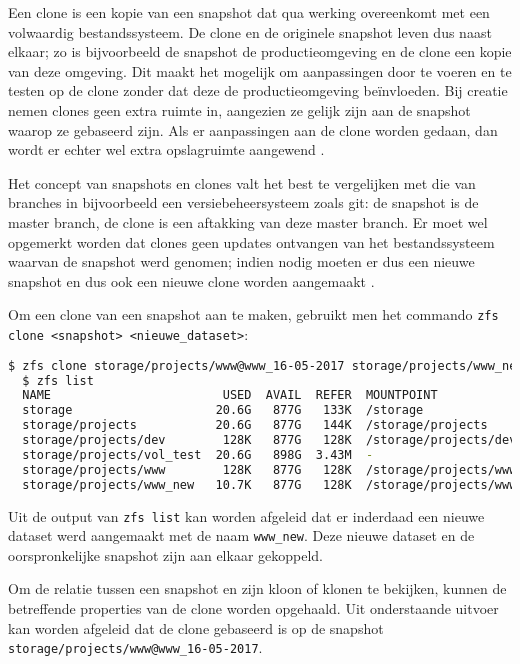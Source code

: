 Een clone is een kopie van een snapshot dat qua werking overeenkomt met een volwaardig bestandssysteem. De clone en de originele snapshot leven dus naast elkaar; zo is bijvoorbeeld de snapshot de productieomgeving en de clone een kopie van deze omgeving. Dit maakt het mogelijk om aanpassingen door te voeren en te testen op de clone zonder dat deze de productieomgeving beïnvloeden. Bij creatie nemen clones geen extra ruimte in, aangezien ze gelijk zijn aan de snapshot waarop ze gebaseerd zijn. Als er aanpassingen aan de clone worden gedaan, dan wordt er echter wel extra opslagruimte aangewend \autocite{Lucas2015}.

Het concept van snapshots en clones valt het best te vergelijken met die van branches in bijvoorbeeld een versiebeheersysteem zoals git: de snapshot is de master branch, de clone is een aftakking van deze master branch. Er moet wel opgemerkt worden dat clones geen updates ontvangen van het bestandssysteem waarvan de snapshot werd genomen; indien nodig moeten er dus een nieuwe snapshot en dus ook een nieuwe clone worden aangemaakt \autocite{Lucas2015}.

Om een clone van een snapshot aan te maken, gebruikt men het commando \texttt{zfs clone <snapshot> <nieuwe\_dataset>}:

\begin{lstlisting}[language=bash,style=command_style] 
  $ zfs clone storage/projects/www@www_16-05-2017 storage/projects/www_new
  $ zfs list
  NAME                        USED  AVAIL  REFER  MOUNTPOINT
  storage                    20.6G   877G   133K  /storage
  storage/projects           20.6G   877G   144K  /storage/projects
  storage/projects/dev        128K   877G   128K  /storage/projects/dev
  storage/projects/vol_test  20.6G   898G  3.43M  -
  storage/projects/www        128K   877G   128K  /storage/projects/www
  storage/projects/www_new   10.7K   877G   128K  /storage/projects/www_new
\end{lstlisting}

Uit de output van \texttt{zfs list} kan worden afgeleid dat er inderdaad een nieuwe dataset werd aangemaakt met de naam \texttt{www\_new}. Deze nieuwe dataset en de oorspronkelijke snapshot zijn aan elkaar gekoppeld. 

Om de relatie tussen een snapshot en zijn kloon of klonen te bekijken, kunnen de betreffende properties van de clone worden opgehaald. Uit onderstaande uitvoer kan worden afgeleid dat de clone gebaseerd is op de snapshot \texttt{storage/projects/www@www\_16-05-2017}.

